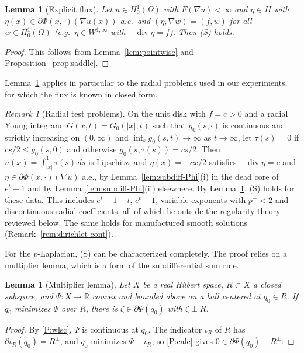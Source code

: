 \documentclass[11pt]{amsart}
\newtheorem{lemma}[theorem]{Lemma}
\theoremstyle{definition}
\theoremstyle{remark}
\newtheorem{remark}[theorem]{Remark}
\numberwithin{equation}{section}
\newcommand{\R}{\mathbb{R}}
\newcommand{\abs}[1]{\lvert #1\rvert}
\DeclareMathOperator{\divg}{div}
\begin{document}
\begin{lemma}[Explicit flux]\label{lem:explicit}
Let $u\in H^1_0(\Omega)$ with $F(\nabla u)<\infty$ and $\eta\in H$ with $\eta(x)\in\partial\Phi(x,\cdot)(\nabla u(x))$ a.e.\ and $(\eta,\nabla w)=(f,w)$ for all $w\in H^1_0(\Omega)$ \textup(e.g.\ $\eta\in W^{1,\infty}$ with $-\divg\eta=f$\textup). Then \textup{(S)} holds.
\end{lemma}
\begin{proof}
This follows from Lemma~\ref{lem:pointwise} and Proposition~\ref{prop:saddle}.
\end{proof}

Lemma~\ref{lem:explicit} applies in particular to the radial problems used in our experiments, for which the flux is known in closed form.

\begin{remark}[Radial test problems]\label{rem:radial-S}
On the unit disk with $f=c>0$ and a radial Young integrand $G(x,t)=G_0(\abs x,t)$ such that $g_0(s,\cdot)$ is continuous and strictly increasing on $(0,\infty)$ and $\inf_sg_0(s,t)\to\infty$ as $t\to\infty$, let $\tau(s)=0$ if $cs/2\le g_0(s,0)$ and otherwise $g_0(s,\tau(s))=cs/2$. Then $u(x)=\int_{\abs x}^1\tau(s)\,ds$ is Lipschitz, and $\eta(x)=-cx/2$ satisfies $-\divg\eta=c$ and $\eta\in\partial\Phi(x,\cdot)(\nabla u)$ a.e., by Lemma~\ref{lem:subdiff-Phi}(i) in the dead core of $e^t-1$ and by Lemma~\ref{lem:subdiff-Phi}(ii) elsewhere. By Lemma~\ref{lem:explicit}, (S) holds for these data. This includes $e^t-1-t$, $e^t-1$, variable exponents with $p^-<2$ and discontinuous radial coefficients, all of which lie outside the regularity theory reviewed below. The same holds for manufactured smooth solutions (Remark~\ref{rem:dirichlet-cont}).
\end{remark}

For the $p$-Laplacian, (S) can be characterized completely. The proof relies on a multiplier lemma, which is a form of the subdifferential sum rule.

\begin{lemma}[Multiplier lemma]\label{lem:multiplier}
Let $X$ be a real Hilbert space, $R\subset X$ a closed subspace, and $\Psi\colon X\to\R$ convex and bounded above on a ball centered at $q_0\in R$. If $q_0$ minimizes $\Psi$ over $R$, there is $\zeta\in\partial\Psi(q_0)$ with $\zeta\perp R$.
\end{lemma}
\begin{proof}
By \ref{P:wlsc}, $\Psi$ is continuous at $q_0$. The indicator $\iota_R$ of $R$ has $\partial\iota_R(q_0)=R^\perp$, and $q_0$ minimizes $\Psi+\iota_R$, so \ref{P:calc} gives $0\in\partial\Psi(q_0)+R^\perp$.
\end{proof}
\end{document}
